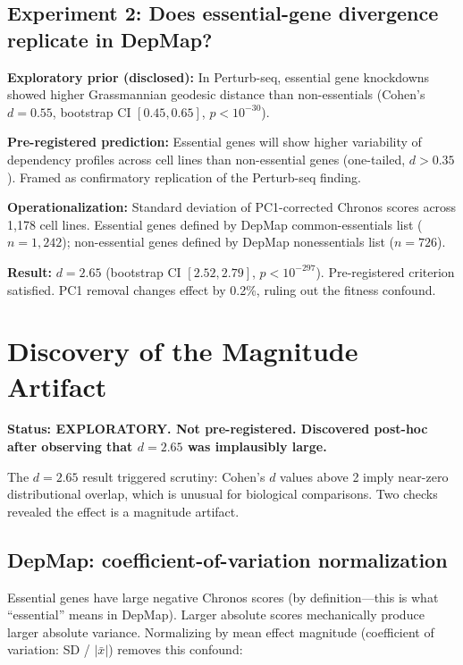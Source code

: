 \documentclass[11pt]{article}
\begin{document}
\subsection{Experiment 2: Does essential-gene divergence replicate in DepMap?}

\textbf{Exploratory prior (disclosed):} In Perturb-seq, essential gene
knockdowns showed higher Grassmannian geodesic distance than non-essentials
(Cohen's $d = 0.55$, bootstrap CI $[0.45, 0.65]$, $p < 10^{-30}$).

\textbf{Pre-registered prediction:} Essential genes will show higher
variability of dependency profiles across cell lines than non-essential
genes (one-tailed, $d > 0.35$). Framed as confirmatory replication of
the Perturb-seq finding.

\textbf{Operationalization:} Standard deviation of PC1-corrected Chronos
scores across 1{,}178 cell lines. Essential genes defined by DepMap
common-essentials list ($n = 1{,}242$); non-essential genes defined by
DepMap nonessentials list ($n = 726$).

\textbf{Result:} $d = 2.65$ (bootstrap CI $[2.52, 2.79]$, $p <
10^{-297}$). Pre-registered criterion satisfied. PC1 removal changes
effect by 0.2\%, ruling out the fitness confound.

\section{Discovery of the Magnitude Artifact}
\label{sec:artifact}

\textbf{Status: EXPLORATORY. Not pre-registered. Discovered post-hoc
after observing that $d = 2.65$ was implausibly large.}

The $d = 2.65$ result triggered scrutiny: Cohen's $d$ values above 2
imply near-zero distributional overlap, which is unusual for biological
comparisons. Two checks revealed the effect is a magnitude artifact.

\subsection{DepMap: coefficient-of-variation normalization}

Essential genes have large negative Chronos scores (by definition---this
is what ``essential'' means in DepMap). Larger absolute scores
mechanically produce larger absolute variance. Normalizing by mean
effect magnitude (coefficient of variation: SD / $|\bar{x}|$) removes
this confound:
\end{document}
